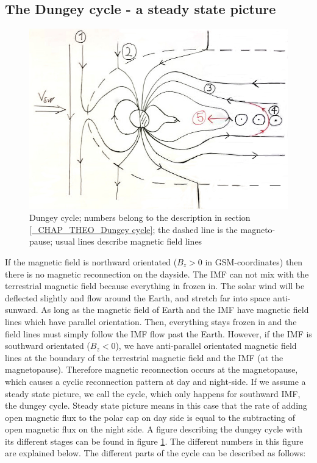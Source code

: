 \documentclass[10pt,a4paper]{article}
\begin{document}
\subsection{The Dungey cycle - a steady state picture \label{_CHAP_THEO_Dungey cycle}}

\begin{figure}[h]
\centering
\caption{Dungey cycle; numbers belong to the description in section \ref{_CHAP_THEO_Dungey cycle}; the dashed line is the magneto-pause; usual lines describe magnetic field lines}
\label{Dungey cycle}
\includegraphics[scale=0.5]{solvind.jpg}
\end{figure}
If the magnetic field is northward orientated ($B_z>0$ in GSM-coordinates) then there is no magnetic reconnection on the dayside. 
The IMF can not mix with the terrestrial magnetic field because everything in frozen in. The solar wind will be deflected slightly and 
flow around the Earth, and stretch far into space anti-sunward. As long as the magnetic field of Earth and the IMF have magnetic field lines which have parallel orientation.  
Then, everything stays frozen in and the field lines must simply follow the IMF flow past the Earth. However, if the IMF is southward orientated ($B_z<0$), we have anti-parallel
orientated magnetic field lines at the boundary of the terrestrial magnetic field and the IMF (at the magnetopause). Therefore magnetic reconnection occurs at the
magnetopause, which causes a cyclic reconnection pattern at day and night-side. If we assume a steady state picture, we call the cycle, which only happens for 
southward IMF, the dungey cycle. Steady state picture means in this case that the rate of adding open magnetic flux to the polar cap on day side is equal to 
the subtracting of open magnetic flux on the night side. A figure describing the dungey cycle with its different stages can be found in figure \ref{Dungey cycle}. 
The different numbers in this figure are explained below. The different parts of the cycle can be described as follows:
\end{document}
